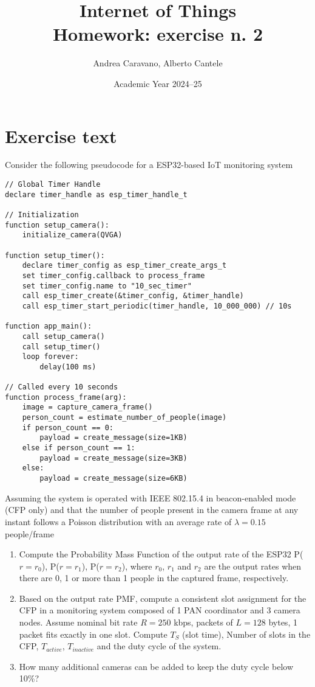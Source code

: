 \documentclass[a4paper,11pt]{article} %
\title{\textbf{Internet of Things}\\Homework: exercise n. 2}
\author{Andrea Caravano, Alberto Cantele}
\date{Academic Year 2024--25}
\begin{document}
\maketitle


\section*{Exercise text}\label{exercise-text}

Consider the following pseudocode for a ESP32-based IoT monitoring system

\begin{verbatim}
// Global Timer Handle
declare timer_handle as esp_timer_handle_t

// Initialization
function setup_camera():
    initialize_camera(QVGA)

function setup_timer():
    declare timer_config as esp_timer_create_args_t
    set timer_config.callback to process_frame
    set timer_config.name to "10_sec_timer"
    call esp_timer_create(&timer_config, &timer_handle)
    call esp_timer_start_periodic(timer_handle, 10_000_000) // 10s

function app_main():
    call setup_camera()
    call setup_timer()
    loop forever:
        delay(100 ms)

// Called every 10 seconds
function process_frame(arg):
    image = capture_camera_frame()
    person_count = estimate_number_of_people(image)
    if person_count == 0:
        payload = create_message(size=1KB)
    else if person_count == 1:
        payload = create_message(size=3KB)
    else:
        payload = create_message(size=6KB)
\end{verbatim}

Assuming the system is operated with IEEE 802.15.4 in beacon-enabled mode (CFP only) and that the number of people present in the camera frame at any instant follows a Poisson distribution with an average rate of $\lambda = 0.15$ people/frame

\begin{enumerate}
    \item Compute the Probability Mass Function of the output rate of the ESP32 P($r = r_0$), P($r = r_1$), P($r = r_2$), where $r_0$, $r_1$ and $r_2$ are the output rates when there are 0, 1 or more than 1 people in the captured frame, respectively.
    \item Based on the output rate PMF, compute a consistent slot assignment for the CFP in a monitoring system composed of 1 PAN coordinator and 3 camera nodes. Assume nominal bit rate $R=250$ kbps, packets of $L=128$ bytes, 1 packet fits exactly in one slot. Compute $T_S$ (slot time), Number of slots in the CFP, $T_{active}$, $T_{inactive}$ and the duty cycle of the system.
    \item How many additional cameras can be added to keep the duty cycle below 10\%?
\end{enumerate}
\end{document}
